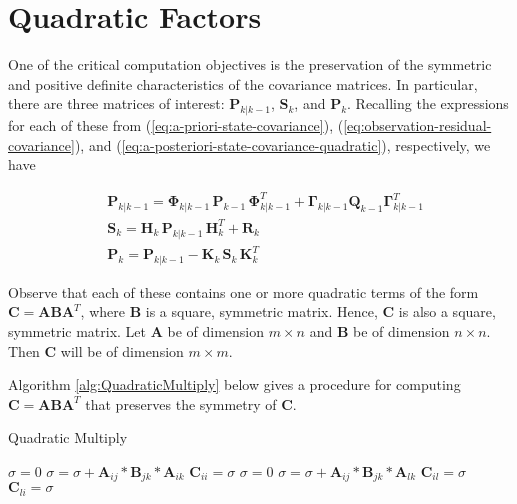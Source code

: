 \section{Quadratic Factors}
\label{Quadratic Factors}

One of the critical computation objectives is the preservation of the symmetric and
positive definite characteristics of the covariance matrices. In particular, there are
three matrices of interest: $\mathbf{P}_{k|k-1}$, $\mathbf{S}_k$, and $\mathbf{P}_k$.
Recalling the expressions for each of these from
(\ref{eq:a-priori-state-covariance}),
(\ref{eq:observation-residual-covariance}),
and (\ref{eq:a-posteriori-state-covariance-quadratic}),
respectively, we have

\begin{equation*}
    \begin{aligned}
        & \mathbf{P}_{k|k-1} = \mathbf{\Phi}_{k|k-1} \, \mathbf{P}_{k-1} \, \mathbf{\Phi}_{k|k-1}^T + \mathbf{\Gamma}_{k|k-1} \mathbf{Q}_{k-1} \mathbf{\Gamma}_{k|k-1}^T \\
        & \mathbf{S}_{k} = \mathbf{H}_{k} \, \mathbf{P}_{k|k-1} \, \mathbf{H}_{k}^T + \mathbf{R}_{k} \\
        & \mathbf{P}_k = \mathbf{P}_{k|k-1} - \mathbf{K}_{k} \, \mathbf{S}_{k} \, \mathbf{K}_{k}^T
    \end{aligned}
\end{equation*}

Observe that each of these contains one or more quadratic terms of the form $\mathbf{C} = \mathbf{A} \mathbf{B} \mathbf{A}^T$,
where $\mathbf{B}$ is a square, symmetric matrix. Hence, $\mathbf{C}$ is also a square,
symmetric matrix. Let $\mathbf{A}$ be of dimension $m \times n$ and $\mathbf{B}$ be of
dimension $n \times n$. Then $\mathbf{C}$ will be of dimension $m \times m$.

Algorithm \ref{alg:QuadraticMultiply} below gives a procedure for computing
$\mathbf{C} = \mathbf{A} \mathbf{B} \mathbf{A}^T$ that preserves the symmetry of
$\mathbf{C}$.

\begin{algorithm}
    \caption{Quadratic Multiply}
    \label{alg:QuadraticMultiply}
    \begin{algorithmic}
            \STATE $\sigma = 0$
                    \STATE $\sigma = \sigma + \mathbf{A}_{ij} * \mathbf{B}_{jk} * \mathbf{A}_{ik}$
                \ENDFOR
            \ENDFOR
            \STATE $\mathbf{C}_{ii} = \sigma$
                \STATE $\sigma = 0$
                        \STATE $\sigma = \sigma + \mathbf{A}_{ij} * \mathbf{B}_{jk} * \mathbf{A}_{lk}$
                    \ENDFOR
                \ENDFOR
                \STATE $\mathbf{C}_{il} = \sigma$
                \STATE $\mathbf{C}_{li} = \sigma$
            \ENDFOR
        \ENDFOR
    \end{algorithmic}
\end{algorithm}

